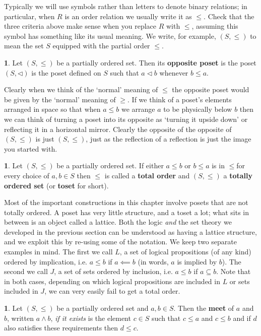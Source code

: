 \documentclass[oneside,english]{amsbook}
\numberwithin{section}{chapter}
\theoremstyle{plain}
\theoremstyle{definition}
\newtheorem{defn}[thm]{\protect\definitionname}
\providecommand{\definitionname}{Definition}
\begin{document}
Typically we will use symbols rather than letters to denote binary relations; in particular, when $R$ is an order relation we usually write it as $\le$. Check that the three criteria above make sense when you replace $R$ with $\le$, assuming this symbol has something like its usual meaning. We write, for example, $(S,\le)$ to mean the set $S$ equipped with the partial order $\le$. 

\begin{defn} 
	Let $(S,\le)$ be a partially ordered set. Then its \textbf{opposite poset} is the poset $(S,\lhd)$ is the poset defined on $S$ such that $a\lhd b$ whenever $b\le a$. 
\end{defn} 

Clearly when we think of the `normal' meaning of $\le$ the opposite poset would be given by the `normal' meaning of $\ge$. If we think of a poset's elements arranged in space so that when $a\le b$ we arrange $a$ to be physically below $b$ then we can think of turning a poset into its opposite as `turning it upside down' or reflecting it in a horizontal mirror. Clearly the opposite of the opposite of $(S,\le)$ is just $(S,\le)$, just as the reflection of a reflection is just the image you started with. 

\begin{defn} 
	Let $(S,\le)$ be a partially ordered set. If either $a\le b$ or $b\le a$ is in $\le$for every choice of $a,b\in S$ then $\le$ is called a \textbf{total order} and $(S,\le)$ a \textbf{totally ordered set }(or \textbf{toset }for short). 
\end{defn} 

Most of the important constructions in this chapter involve posets that are not totally ordered. A poset has very little structure, and a toset a lot; what sits in between is an object called a lattice. Both the logic \emph{and }the set theory we developed in the previous section can be understood as having a lattice structure, and we exploit this by re-using some of the notation. We keep two separate examples in mind. The first we call $L$, a set of logical propositions (of any kind) ordered by implication, i.e. $a\le b$ if $a\impliedby b$ (in words, $a$ is implied by $b$). The second we call $J$, a set of sets ordered by inclusion, i.e. $a\le b$ if $a\subseteq b$. Note that in both cases, depending on which logical propositions are included in $L$ or sets included in $J$, we can very easily fail to get a total order. 

\begin{defn} 
	Let $(S,\le)$ be a partially ordered set and $a,b\in S$. Then the \textbf{meet} of $a$ and $b$, written $a\land b$, \emph{if it exists} is the element $c\in S$ such that $c\le a$ and $c\le b$ and if $d$ also satisfies these requirements then $d\le c$. 
\end{defn}
 
\end{document}
